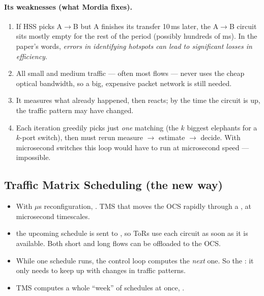 \paragraph{Its weaknesses (what Mordia fixes).}
\begin{enumerate}
\item {} If HSS picks A$\to$B but A finishes its transfer 10\,ms later, the A$\to$B circuit sits mostly empty for the rest of the period (possibly hundreds of ms). In the paper's words, \emph{errors in identifying hotspots can lead to significant losses in efficiency}.
\item {} All small and medium traffic --- often most flows --- never uses the cheap optical bandwidth, so a big, expensive packet network is still needed.
\item {} It measures what already happened, then reacts; by the time the circuit is up, the traffic pattern may have changed.
\item {} Each iteration greedily picks just \emph{one} matching (the $k$ biggest elephants for a $k$-port switch), then must rerun measure $\to$ estimate $\to$ decide. With microsecond switches this loop would have to run at microsecond speed --- impossible.
\end{enumerate}

\subsection{Traffic Matrix Scheduling (the new way)}
\begin{itemize}
\item With $\mu$s reconfiguration, . TMS  that moves the OCS rapidly through a ,  at microsecond timescales.
\item {} the upcoming schedule is sent to , so ToRs use each circuit as soon as it is available. Both short and long flows can be offloaded to the OCS.
\item While one schedule runs, the control loop computes the \emph{next} one. So the : it only needs to keep up with changes in traffic patterns.
\item TMS computes a whole ``week'' of schedules at once, .
\end{itemize}

